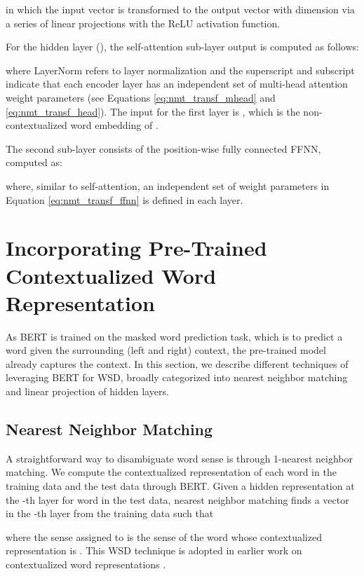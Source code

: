\documentclass[11pt,a4paper]{article}
\begin{document}
in which the input vector  is transformed to the output vector with dimension  via a series of linear projections with the ReLU activation function.

For the hidden layer  (), the self-attention sub-layer output  is computed as follows:

where LayerNorm refers to layer normalization \cite{DBLP:journals/corr/BaKH16} and the superscript  and subscript  indicate that each encoder layer  has an independent set of multi-head attention weight parameters (see Equations \ref{eq:nmt_transf_mhead} and \ref{eq:nmt_transf_head}). The input for the first layer is , which is the non-contextualized word embedding of .

The second sub-layer consists of the position-wise fully connected FFNN, computed as:

where, similar to self-attention, an independent set of weight parameters in Equation \ref{eq:nmt_transf_ffnn} is defined in each layer.

\section{Incorporating Pre-Trained Contextualized Word Representation}
\label{sec:incorporating}

As BERT is trained on the masked word prediction task, which is to predict a word given the surrounding (left and right) context, the pre-trained model already captures the context. In this section, we describe different techniques of leveraging BERT for WSD, broadly categorized into nearest neighbor matching and linear projection of hidden layers.

\subsection{Nearest Neighbor Matching}
\label{sec:incorporating_nearest}

A straightforward way to disambiguate word sense is through 1-nearest neighbor matching. We compute the contextualized representation of each word in the training data and the test data through BERT. Given a hidden representation  at the -th layer for word  in the test data, nearest neighbor matching finds a vector  in the -th layer from the training data such that

where the sense assigned to  is the sense of the word whose contextualized representation is . This WSD technique is adopted in earlier work on contextualized word representations \cite{melamud_context2vec:_2016,peters_deep_2018}.
\end{document}
